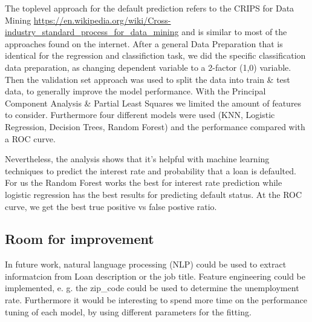 \documentclass[]{article}
\begin{document}
The toplevel approach for the default prediction refers to the CRIPS for
Data Mining
\url{https://en.wikipedia.org/wiki/Cross-industry_standard_process_for_data_mining}
and is similar to most of the approaches found on the internet. After a
general Data Preparation that is identical for the regression and
classifiction task, we did the specific classification data preparation,
as changing dependent variable to a 2-factor (1,0) variable. Then the
validation set approach was used to split the data into train \& test
data, to generally improve the model performance. With the Principal
Component Analysis \& Partial Least Squares we limited the amount of
features to consider. Furthermore four different models were used (KNN,
Logistic Regression, Decision Trees, Random Forest) and the performance
compared with a ROC curve.

Nevertheless, the analysis shows that it's helpful with machine learning
techniques to predict the interest rate and probability that a loan is
defaulted. For us the Random Forest works the best for interest rate
prediction while logistic regression has the best results for predicting
default status. At the ROC curve, we get the best true positive vs false
postive ratio.

\hypertarget{room-for-improvement}{%
\subsection{Room for improvement}\label{room-for-improvement}}

In future work, natural language processing (NLP) could be used to
extract informatcion from Loan description or the job title. Feature
engineering could be implemented, e. g. the zip\_code could be used to
determine the unemployment rate. Furthermore it would be interesting to
spend more time on the performance tuning of each model, by using
different parameters for the fitting.
\end{document}
